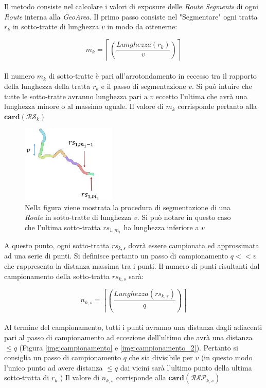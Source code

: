 \noindent Il metodo consiste nel calcolare i valori di exposure delle \textit{Route Segments} di ogni \textit{Route} interna alla \textit{GeoArea}.
Il primo passo consiste nel "Segmentare" ogni tratta $r_k$ in sotto-tratte di lunghezza $v$ in modo da ottenerne:

\begin{equation}\label{eq:numerotratte}
m_{k}=\left\lceil\left(\frac{Lunghezza(r_k)}{v}\right)\right\rceil
\end{equation}
\\
Il numero $m_{k}$ di sotto-tratte è pari all'arrotondamento in eccesso tra il rapporto della lunghezza della tratta $r_k$ e il passo di segmentazione $v$. Si può intuire che tutte le sotto-tratte avranno lunghezza pari a $v$ eccetto l'ultima che avrà una lunghezza minore o al massimo uguale. Il valore di $m_k$ corrisponde pertanto alla $\mathbf{card}(\mathcal{RS}_{k})$
\\


	\begin{figure}[h]
	\centering
	\includegraphics[width=0.4\textwidth]{images/routes2_new}
	\caption{Nella figura viene mostrata la procedura di segmentazione di una \textit{Route} in sotto-tratte di lunghezza $v$. Si può notare in questo caso che  l'ultima sotto-tratta $rs_{1,{m_1}}$ ha lunghezza inferiore a $v$}
	\label{img:segment}
	\end{figure}

\noindent A questo punto, ogni sotto-tratta $rs_{k,s}$ dovrà essere campionata ed approssimata ad una serie di punti. Si definisce pertanto un passo di campionamento $q << v$ che rappresenta la distanza massima tra i punti. Il numero di punti risultanti dal campionamento della sotto-tratta $rs_{k,s}$ sarà:

\begin{equation}\label{eq:numerotratte}
n_{k,s}=\left\lceil\left(\frac{Lunghezza(rs_{k,s})}{q}\right)\right\rceil
\end{equation}
\\
Al termine del campionamento, tutti i punti avranno una distanza dagli adiacenti pari al passo di campionamento ad eccezione dell'ultimo che avrà una distanza $\le q$ (Figura \ref{img:campionamento} e \ref{img:campionamento_2}). Pertanto si consiglia un passo di campionamento $q$ che sia divisibile per $v$ (in questo modo l'unico punto ad avere distanza $\le q$ dai vicini sarà l'ultimo punto della ultima sotto-tratta di $r_k$ ) Il valore di $n_{k,s}$ corrisponde alla $\mathbf{card}(\mathcal{RSP}_{k,s})$
\\

